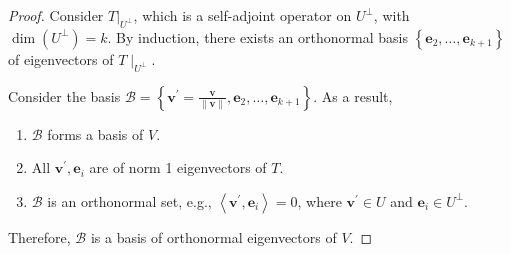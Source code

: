 \begin{proof}
Consider \({\left. T\right| }_{{U}^{ \bot  }}\), which is a self-adjoint operator on \({U}^{ \bot  }\), with \(\dim \left( {U}^{ \bot  }\right)  = k\). By induction, there exists an orthonormal basis \(\left\{  {{\mathbf{e}}_{2},\ldots ,{\mathbf{e}}_{k + 1}}\right\}\) of eigenvectors of \(T{ \mid  }_{{U}^{ \bot  }}\).

Consider the basis \(\mathcal{B} = \left\{  {{\mathbf{v}}^{\prime } = \frac{\mathbf{v}}{\parallel \mathbf{v}\parallel} ,{\mathbf{e}}_{2},\ldots ,{\mathbf{e}}_{k + 1}}\right\}\). As a result,

\begin{enumerate}
    \item \(\mathcal{B}\) forms a basis of \(V\).
    \item All \({\mathbf{v}}^{\prime },{\mathbf{e}}_{i}\) are of norm 1 eigenvectors of \(T\).
    \item \(\mathcal{B}\) is an orthonormal set, e.g., \(\left\langle  {{\mathbf{v}}^{\prime },{\mathbf{e}}_{i}}\right\rangle   = 0\), where \({\mathbf{v}}^{\prime } \in  U\) and \({\mathbf{e}}_{i} \in  {U}^{ \bot  }\).
\end{enumerate}
Therefore, \(\mathcal{B}\) is a basis of orthonormal eigenvectors of \(V\).
\end{proof}

